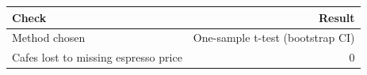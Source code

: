 \begin{tabular}{lr}
\toprule
Check & Result \\
\midrule
Method chosen & One-sample t-test (bootstrap CI) \\
Cafes lost to missing espresso price & 0 \\
\bottomrule
\end{tabular}
